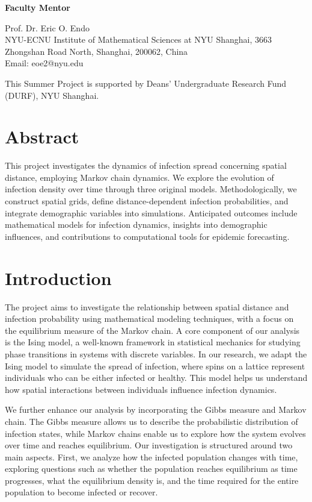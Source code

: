 \documentclass[11pt]{book}
\begin{document}
\thispagestyle{empty}
{\LARGE \bf Faculty Mentor}

\vspace{0.3cm}

{\Large Prof. Dr. Eric O. Endo} \\
NYU-ECNU Institute of Mathematical Sciences at NYU Shanghai, 3663 Zhongshan Road North, Shanghai, 200062, China\\
Email: eoe2@nyu.edu

\vfill

{\Large This Summer Project is supported by Deans' Undergraduate Research Fund (DURF), NYU Shanghai.}


\tableofcontents

\chapter*{Abstract}\label{abstract}

This project investigates the dynamics of infection spread concerning spatial distance, employing Markov chain dynamics. We explore the evolution of infection density over time through three original models. Methodologically, we construct spatial grids, define distance-dependent infection probabilities, and integrate demographic variables into simulations. Anticipated outcomes include mathematical models for infection dynamics, insights into demographic influences, and contributions to computational tools for epidemic forecasting.

\chapter{Introduction}\label{introduction}

The project aims to investigate the relationship between spatial distance and infection probability using mathematical modeling techniques, with a focus on the equilibrium measure of the Markov chain. A core component of our analysis is the Ising model, a well-known framework in statistical mechanics for studying phase transitions in systems with discrete variables. In our research, we adapt the Ising model to simulate the spread of infection, where spins on a lattice represent individuals who can be either infected or healthy. This model helps us understand how spatial interactions between individuals influence infection dynamics.

We further enhance our analysis by incorporating the Gibbs measure and Markov chain. The Gibbs measure allows us to describe the probabilistic distribution of infection states, while Markov chains enable us to explore how the system evolves over time and reaches equilibrium. Our investigation is structured around two main aspects. First, we analyze how the infected population changes with time, exploring questions such as whether the population reaches equilibrium as time progresses, what the equilibrium density is, and the time required for the entire population to become infected or recover.
\end{document}
